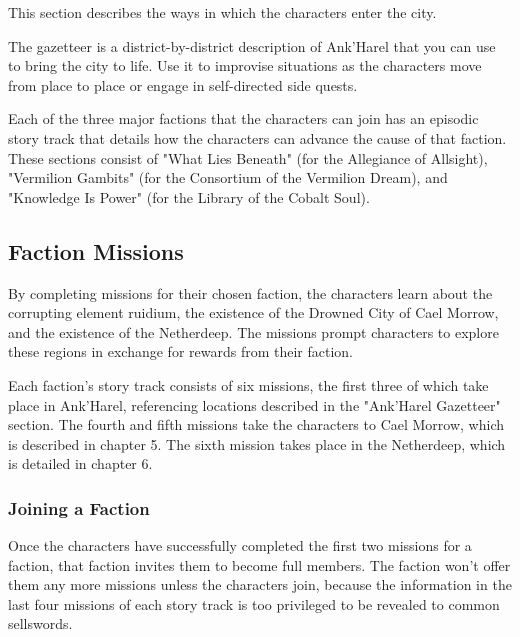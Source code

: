 \documentclass[10pt,a4paper,twoside,bg=print,twocolumn,openany,nodeprecatedcode]{dndbook}
\begin{document}
\begin{description}[nolistsep]

\item[Arrival in Ank'Harel.]
This section describes the ways in which the characters enter the city.

\item[Ank'Harel Gazetteer.]
The gazetteer is a district-by-district description of Ank'Harel that you can use to bring the city to life. Use it to improvise situations as the characters move from place to place or engage in self-directed side quests.

\item[Faction Story Tracks.]
Each of the three major factions that the characters can join has an episodic story track that details how the characters can advance the cause of that faction. These sections consist of "What Lies Beneath" (for the Allegiance of Allsight), "Vermilion Gambits" (for the Consortium of the Vermilion Dream), and "Knowledge Is Power" (for the Library of the Cobalt Soul).
\end{description}

\subsection{Faction Missions}
By completing missions for their chosen faction, the characters learn about the corrupting element ruidium, the existence of the Drowned City of Cael Morrow, and the existence of the Netherdeep. The missions prompt characters to explore these regions in exchange for rewards from their faction.

Each faction's story track consists of six missions, the first three of which take place in Ank'Harel, referencing locations described in the "Ank'Harel Gazetteer" section. The fourth and fifth missions take the characters to Cael Morrow, which is described in chapter 5. The sixth mission takes place in the Netherdeep, which is detailed in chapter 6.

\subsubsection{Joining a Faction}
Once the characters have successfully completed the first two missions for a faction, that faction invites them to become full members. The faction won't offer them any more missions unless the characters join, because the information in the last four missions of each story track is too privileged to be revealed to common sellswords.
\end{document}
